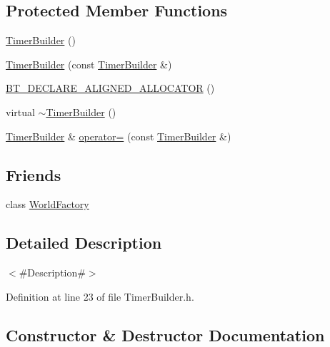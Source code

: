 \subsection*{Protected Member Functions}
\begin{DoxyCompactItemize}
\item 
\mbox{\hyperlink{classnjli_1_1_timer_builder_a1e8b826dc7c0a51493c510658bb716f5}{Timer\+Builder}} ()
\item 
\mbox{\hyperlink{classnjli_1_1_timer_builder_ae5692fe6e38891da25c76bf325f1d58d}{Timer\+Builder}} (const \mbox{\hyperlink{classnjli_1_1_timer_builder}{Timer\+Builder}} \&)
\item 
\mbox{\hyperlink{classnjli_1_1_timer_builder_a19766dc135d3a03774036d99e4065818}{B\+T\+\_\+\+D\+E\+C\+L\+A\+R\+E\+\_\+\+A\+L\+I\+G\+N\+E\+D\+\_\+\+A\+L\+L\+O\+C\+A\+T\+OR}} ()
\item 
virtual \mbox{\hyperlink{classnjli_1_1_timer_builder_a19779297f54975c639c4625501be0194}{$\sim$\+Timer\+Builder}} ()
\item 
\mbox{\hyperlink{classnjli_1_1_timer_builder}{Timer\+Builder}} \& \mbox{\hyperlink{classnjli_1_1_timer_builder_a9767b4b54e47e49aa3d7bd377fd50499}{operator=}} (const \mbox{\hyperlink{classnjli_1_1_timer_builder}{Timer\+Builder}} \&)
\end{DoxyCompactItemize}
\subsection*{Friends}
\begin{DoxyCompactItemize}
\item 
class \mbox{\hyperlink{classnjli_1_1_timer_builder_acb96ebb09abe8f2a37a915a842babfac}{World\+Factory}}
\end{DoxyCompactItemize}


\subsection{Detailed Description}
$<$\#\+Description\#$>$ 

Definition at line 23 of file Timer\+Builder.\+h.



\subsection{Constructor \& Destructor Documentation}
\mbox{\label{classnjli_1_1_timer_builder_a1e8b826dc7c0a51493c510658bb716f5}} 
